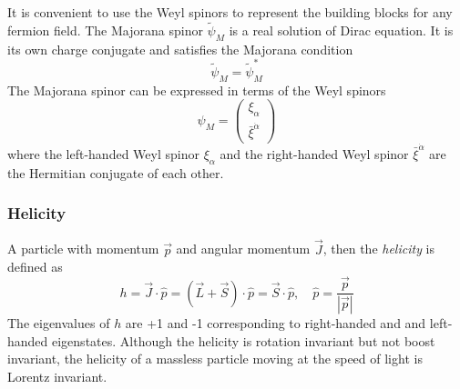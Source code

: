 %
It is convenient to use the Weyl spinors to represent the building blocks for any fermion field.
The Majorana spinor $\tilde{\psi}_{M}$ is a real solution of Dirac equation.
It is its own charge conjugate and satisfies the Majorana condition
%
\begin{equation}
\tilde{\psi}_{M} = \tilde{\psi}_{M}^{*}
\label{eq:susy_majorana_condition}
\end{equation}
%
The Majorana spinor can be expressed in terms of the Weyl spinors
%
\begin{equation}
\psi_{M} = \left(\begin{matrix}\xi_{\alpha}\\\bar{\xi}^{\dot{\alpha}}\end{matrix}\right)
\label{eq:susy_majorana_spinor}
\end{equation}
%
where the left-handed Weyl spinor $\xi_{\alpha}$ and the right-handed Weyl spinor $\bar{\xi}^{\dot{\alpha}}$ are the Hermitian conjugate of each other.


\subsubsection{Helicity}
\label{subsubsec:susy_helicity}
A particle with momentum $\vec{p}$ and angular momentum $\vec{J}$, then the \textit{helicity} is defined as
%
\begin{equation}
h = \vec{J} \cdot \hat{p} = (\vec{L} + \vec{S}) \cdot \hat{p} = \vec{S} \cdot \hat{p}, \quad \hat{p} = \frac{\vec{p}}{|\vec{p}|}
\label{eq:susy_helicity}
\end{equation}
%
The eigenvalues of $h$ are +1 and -1 corresponding to right-handed and and left-handed eigenstates.
Although the helicity is rotation invariant but not boost invariant, the helicity of a massless particle moving at the speed of light is Lorentz invariant.


